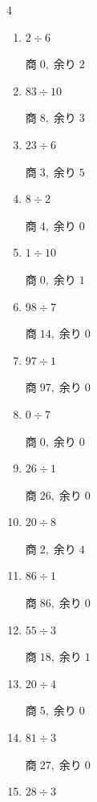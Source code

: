 \begin{multicols}{4}
\begin{enumerate}
\columnbreak %

\resetques

  \item $2 \div 6$

        $商\; 0,\; 余り\; 2$

  \item $83 \div 10$

        $商\; 8,\; 余り\; 3$

  \item $23 \div 6$

        $商\; 3,\; 余り\; 5$

  \item $8 \div 2$

        $商\; 4,\; 余り\; 0$

  \item $1 \div 10$

        $商\; 0,\; 余り\; 1$

  \item $98 \div 7$

        $商\; 14,\; 余り\; 0$

  \item $97 \div 1$

        $商\; 97,\; 余り\; 0$

  \item $0 \div 7$

        $商\; 0,\; 余り\; 0$

  \item $26 \div 1$

        $商\; 26,\; 余り\; 0$

  \item $20 \div 8$

        $商\; 2,\; 余り\; 4$

  \item $86 \div 1$

        $商\; 86,\; 余り\; 0$

  \item $55 \div 3$

        $商\; 18,\; 余り\; 1$

  \item $20 \div 4$

        $商\; 5,\; 余り\; 0$

  \item $81 \div 3$

        $商\; 27,\; 余り\; 0$

  \item $28 \div 3$


\end{enumerate}
\end{multicols}
